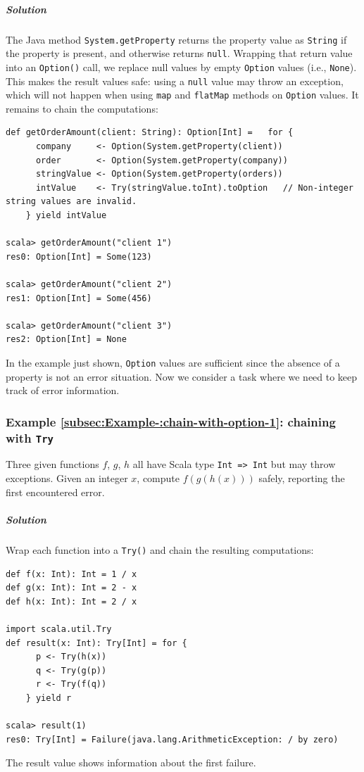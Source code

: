 \subparagraph{Solution}

The Java method \lstinline!System.getProperty! returns the property
value as \lstinline!String! if the property is present, and otherwise
returns \lstinline!null!. Wrapping that return value into an \lstinline!Option()!
call, we replace null values by empty \lstinline!Option! values (i.e.,
\lstinline!None!). This makes the result values safe: using a \lstinline!null!
value may throw an exception, which will not happen when using \lstinline!map!
and \lstinline!flatMap! methods on \lstinline!Option! values. It
remains to chain the computations:

\begin{lstlisting}
def getOrderAmount(client: String): Option[Int] =   for {
      company     <- Option(System.getProperty(client))
      order       <- Option(System.getProperty(company))
      stringValue <- Option(System.getProperty(orders))
      intValue    <- Try(stringValue.toInt).toOption   // Non-integer string values are invalid.
    } yield intValue

scala> getOrderAmount("client 1")
res0: Option[Int] = Some(123)

scala> getOrderAmount("client 2")
res1: Option[Int] = Some(456)

scala> getOrderAmount("client 3")
res2: Option[Int] = None
\end{lstlisting}

In the example just shown, \lstinline!Option! values are sufficient
since the absence of a property is not an error situation. Now we
consider a task where we need to keep track of error information.

\subsubsection{Example \label{subsec:Example-:chain-with-option-1}\ref{subsec:Example-:chain-with-option-1}:
chaining with \texttt{Try}}

Three given functions $f$, $g$, $h$ all have Scala type \lstinline!Int => Int!
but may throw exceptions. Given an integer $x$, compute $f(g(h(x)))$
safely, reporting the first encountered error.

\subparagraph{Solution}

Wrap each function into a \lstinline!Try()! and chain the resulting
computations:
\begin{lstlisting}
def f(x: Int): Int = 1 / x
def g(x: Int): Int = 2 - x
def h(x: Int): Int = 2 / x

import scala.util.Try
def result(x: Int): Try[Int] = for {
      p <- Try(h(x))
      q <- Try(g(p))
      r <- Try(f(q))
    } yield r

scala> result(1)
res0: Try[Int] = Failure(java.lang.ArithmeticException: / by zero)
\end{lstlisting}
The result value shows information about the first failure.

